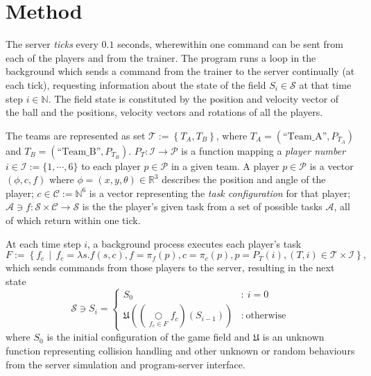 \documentclass[10pt,a4paper]{article}
\begin{document}
\section{Method}

The server \textit{ticks} every \(0.1\) seconds, wherewithin one command can be sent from each of the players and from the trainer. The program runs a loop in the background which sends a command from the trainer to the server continually (at each tick), requesting information about the state of the field \(S_i \in \mathcal{S}\) at that time step \(i \in \mathbb{N}\). The field state is constituted by the position and velocity vector of the ball and the positions, velocity vectors and rotations of all the players.

The teams are represented as set \(\mathcal{T} := \left\{ T_A, T_B \right\}\), where \(T_A = (\text{``Team\_A''}, P_{T_A})\) and \(T_B = (\text{``Team\_B''}, P_{T_B})\). \(P_T : \mathcal{I} \to \mathcal{P} \) is a function mapping a \textit{player number} \(i\in \mathcal{I} := \{1,\cdots,6\}\) to each player \(p \in \mathcal{P}\) in a given team. A player \(p\in \mathcal{P}\) is a vector \((\phi, c, f)\) where \(\phi = (x, y, \theta) \in \mathbb{R}^3\) describes the position and angle of the player; \(c \in \mathcal{C} := \mathbb{N}^6\) is a vector representing the \textit{task configuration} for that player; \(\mathcal{A} \ni f:\mathcal{S}\times \mathcal{C} \to \mathcal{S}\) is the the player's given task from a set of possible tasks \(\mathcal{A}\), all of which return within one tick.%

At each time step \(i\), a background process executes each player's task
\[
		F := \left\{ f_c \,\middle|\, f_c = \lambda s.f(s, c), f = \pi_f(p), c = \pi_c(p), p = P_T(i), (T,i)\in\mathcal{T} \times \mathcal{I}  \right\}
\text{,}
\]
which sends commands from those players to the server, resulting in the next state 
\[
		\mathcal{S} \ni S_{i} = \left\{
			\begin{array}{cl}
				S_0 & : \ i = 0 \\
					\mathfrak{U} \left( \left(\underset{f_c\in F}\bigcirc f_c\right)(S_{i-1}) \right) & : \ \text{otherwise}
			\end{array}
		\right.
\]
where \(S_0\) is the initial configuration of the game field and \(\mathfrak{U}\) is an unknown function representing collision handling and other unknown or random behaviours from the server simulation and program-server interface. %
\end{document}
